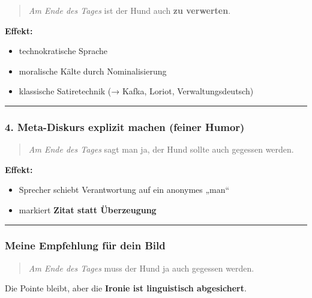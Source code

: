 \documentclass[
  letterpaper,
  DIV=11,
  numbers=noendperiod]{scrartcl}
\providecommand{\tightlist}{%
  \setlength{\itemsep}{0pt}\setlength{\parskip}{0pt}}
\begin{document}
\begin{quote}
\emph{Am Ende des Tages} ist der Hund auch \textbf{zu verwerten}.
\end{quote}

\textbf{Effekt:}

\begin{itemize}
\tightlist
\item
  technokratische Sprache
\item
  moralische Kälte durch Nominalisierung
\item
  klassische Satiretechnik (→ Kafka, Loriot, Verwaltungsdeutsch)
\end{itemize}

\begin{center}\rule{0.5\linewidth}{0.5pt}\end{center}

\subsubsection{4. Meta-Diskurs explizit machen (feiner
Humor)}\label{meta-diskurs-explizit-machen-feiner-humor}

\begin{quote}
\emph{Am Ende des Tages} sagt man ja, der Hund sollte auch gegessen
werden.
\end{quote}

\textbf{Effekt:}

\begin{itemize}
\tightlist
\item
  Sprecher schiebt Verantwortung auf ein anonymes „man``
\item
  markiert \textbf{Zitat statt Überzeugung}
\end{itemize}

\begin{center}\rule{0.5\linewidth}{0.5pt}\end{center}

\subsubsection{Meine Empfehlung für dein
Bild}\label{meine-empfehlung-fuxfcr-dein-bild}

\begin{quote}
\emph{Am Ende des Tages} muss der Hund ja auch gegessen werden.
\end{quote}

Die Pointe bleibt, aber die \textbf{Ironie ist linguistisch
abgesichert}.
\end{document}
